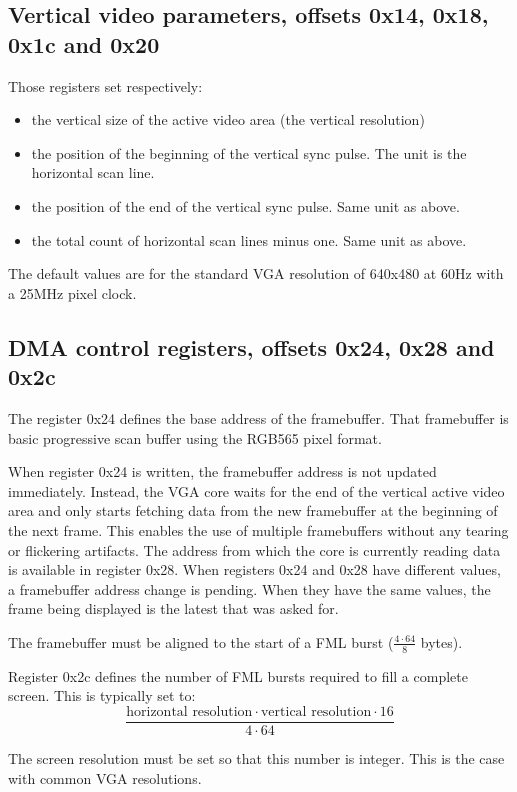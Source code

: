 \documentclass[a4paper,11pt]{article}
\begin{document}
\subsection{Vertical video parameters, offsets 0x14, 0x18, 0x1c and 0x20}
Those registers set respectively:
\begin{itemize}
\item the vertical size of the active video area (the vertical resolution)
\item the position of the beginning of the vertical sync pulse. The unit is the horizontal scan line.
\item the position of the end of the vertical sync pulse. Same unit as above.
\item the total count of horizontal scan lines minus one. Same unit as above.
\end{itemize}
The default values are for the standard VGA resolution of 640x480 at 60Hz with a 25MHz pixel clock.

\subsection{DMA control registers, offsets 0x24, 0x28 and 0x2c}
The register 0x24 defines the base address of the framebuffer. That framebuffer is basic progressive scan buffer using the RGB565 pixel format.

When register 0x24 is written, the framebuffer address is not updated immediately. Instead, the VGA core waits for the end of the vertical active video area and only starts fetching data from the new framebuffer at the beginning of the next frame. This enables the use of multiple framebuffers without any tearing or flickering artifacts. The address from which the core is currently reading data is available in register 0x28.
When registers 0x24 and 0x28 have different values, a framebuffer address change is pending. When they have the same values, the frame being displayed is the latest that was asked for.

The framebuffer must be aligned to the start of a FML burst ($\frac{4 \cdot 64}{8}$ bytes).

Register 0x2c defines the number of FML bursts required to fill a complete screen. This is typically set to:
\[
\frac{\text{horizontal resolution} \cdot \text{vertical resolution} \cdot 16}{4 \cdot 64}
\]

The screen resolution must be set so that this number is integer. This is the case with common VGA resolutions.
\end{document}
